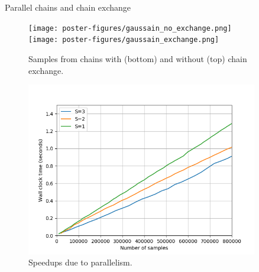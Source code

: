\documentclass[final]{beamer}
\newlength{\sepwid}
\newlength{\onecolwid}
\newlength{\twocolwid}
\begin{document}
\begin{frame}[t]
\begin{columns}[t]
\begin{column}{\onecolwid}

\end{column} %

\begin{column}{\sepwid}\end{column} %

\begin{column}{\twocolwid} %

\begin{columns}[t,totalwidth=\twocolwid] %

\begin{column}{\onecolwid}\vspace{-.6in} %


\begin{block}{Parallel chains and chain exchange}

  \begin{figure}
    \texttt{[image: poster-figures/gaussain\_no\_exchange.png]}\\
    \texttt{[image: poster-figures/gaussain\_exchange.png]}
    \caption{Samples from chains with (bottom) and without (top) chain exchange.}
    \label{fig:travelling-chain-samples}
  \end{figure}
  \vspace{-2cm}
  \begin{figure}
    \includegraphics[width=0.8\linewidth]{poster-figures/speedup-parallel.png}
    \caption{Speedups due to parallelism.}
    \label{fig:speedup-partitioning}
  \end{figure}


\end{block}
\end{column}
\end{columns}
\end{column}
\end{columns}
\end{frame}
\end{document}

